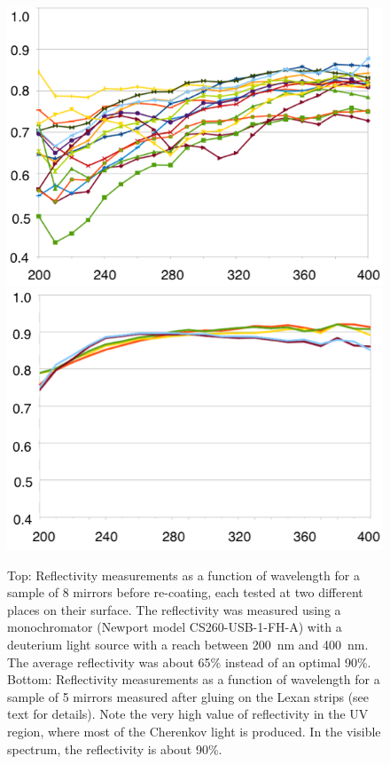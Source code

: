 \begin{figure}[ht]
\centering
	\includegraphics[width=0.99\columnwidth, height=0.7\columnwidth]{img/mirrorsReflectivityBefore.png}
	\includegraphics[width=0.99\columnwidth, height=0.7\columnwidth]{img/mirrorsReflectivityAfter.png}
	\caption{Top: Reflectivity measurements as a function of wavelength for a sample of 8 mirrors before re-coating,
          each tested at two different places on their surface. The reflectivity was measured using a monochromator
          (Newport model CS260-USB-1-FH-A) with a deuterium light source with a reach between 200~nm and 400~nm.
          The average reflectivity was about 65\% instead of an optimal 90\%. Bottom: Reflectivity measurements as a
          function of wavelength for a sample of 5 mirrors measured after gluing on the Lexan strips (see text for
          details). Note the very high value of reflectivity in the UV region, where most of the Cherenkov light is
          produced. In the visible spectrum, the reflectivity is about 90\%.}
	\label{fig:reflectivityBeforeAndAfter}
\end{figure}

